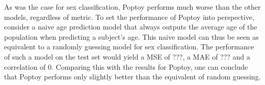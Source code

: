 As was the case for sex classification, Poptoy performs much worse than the other models, regardless of metric. To set the performance of Poptoy into perspective, consider a naive age prediction model that always outputs the average age of the population when predicting a subject's age. This naive model can thus be seen as equivalent to a randomly guessing model for sex classification. The performance of such a model on the test set would yield a MSE of ???, a MAE of ??? and a correlation of 0. Comparing this with the results for Poptoy, one can conclude that Poptoy performs only slightly better than the equivalent of random guessing. 





